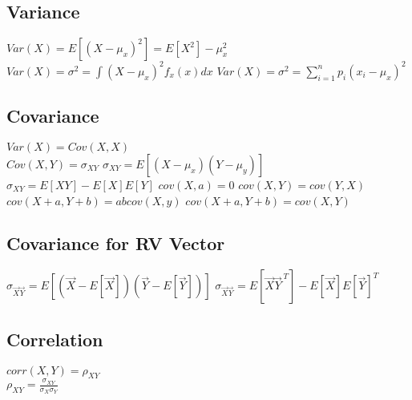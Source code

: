 \subsection*{Variance}
$Var(X)=E\left[(X-\mu_x)^2\right]=E[X^2]-\mu_x^2$
$Var(X)=\sigma^2=\int(X-\mu_x)^2f_x(x)dx$
$Var(X)=\sigma^2=\sum_{i=1}^{n}p_i(x_i-\mu_x)^2$
    
\subsection*{Covariance}
$Var(X)=Cov(X,X)$\\
$Cov(X,Y)=\sigma_{XY}$
$\sigma_{XY}=E[(X-\mu_x)(Y-\mu_y)]$
$\sigma_{XY}=E[XY]-E[X]E[Y]$
$cov(X, a) = 0$
$cov(X,Y) = cov(Y,X)$
$cov(X+a, Y+b)=abcov(X,y)$
$cov(X+a,Y+b)=cov(X,Y)$

\subsection*{Covariance for RV Vector}
$\sigma_{\vec{X}\vec{Y}}=E[(\vec{X}-E[\vec{X}])(\vec{Y}-E[\vec{Y}])]$
$\sigma_{\vec{X}\vec{Y}}=E[\vec{X}\vec{Y}^{\,T}]-E[\vec{X}]E[\vec{Y}]^T$

\subsection*{Correlation}
$corr(X,Y)=\rho_{XY}$\\
$\rho_{XY}=\frac{\sigma_{XY}}{\sigma_X\sigma_Y}$




